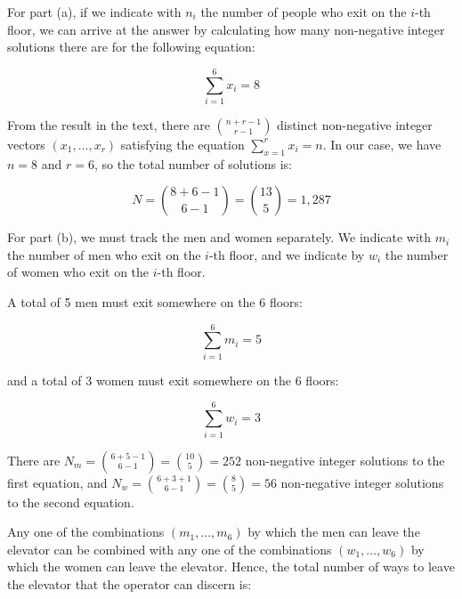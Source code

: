 \documentclass[a4paper,12pt]{article}
\begin{document}
\vspace{4mm}

For part (a), if we indicate with $n_i$ the number of people who exit on the $i$-th floor, we can arrive at the answer by calculating how many non-negative integer solutions there are for the following equation:

\[ \sum_{i=1}^6 x_i = 8 \]

From the result in the text, there are $\binom{n+r-1}{r-1}$ distinct non-negative integer vectors $(x_1, ..., x_r)$ satisfying the equation $\sum_{x=1}^r x_i = n$. In our case, we have $n=8$ and $r=6$, so the total number of solutions is:

\[ N = \binom{8+6-1}{6-1} = \binom{13}{5} = 1,287 \]

For part (b), we must track the men and women separately. We indicate with $m_i$ the number of men who exit on the $i$-th floor, and we indicate by $w_i$ the number of women who exit on the $i$-th floor. 

A total of 5 men must exit somewhere on the 6 floors:

\[ \sum_{i=1}^6 m_i = 5 \]

\noindent
and a total of 3 women must exit somewhere on the 6 floors:

\[ \sum_{i=1}^6 w_i = 3 \]

There are $N_m = \binom{6+5-1}{6-1} = \binom{10}{5} = 252$ non-negative integer solutions to the first equation, and $N_w = \binom{6+3+1}{6-1} = \binom{8}{5} = 56$ non-negative integer solutions to the second equation. 

Any one of the combinations $(m_1,...,m_6)$ by which the men can leave the elevator can be combined with any one of the combinations $(w_1, ..., w_6)$ by which the women can leave the elevator. Hence, the total number of ways to leave the elevator that the operator can discern is:
\end{document}
